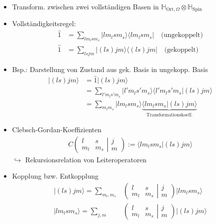 \documentclass[10pt,article,colorback,accentcolor=tud9d]{scrartcl}
\begin{document}
\begin{itemize}
	\item Transform. zwischen zwei vollständigen Basen in $\mathbb{H}_{\text{Ort},\Omega}\otimes\mathbb{H}_\text{Spin}$
  \item Vollständigkeitsregel:
    \begin{align}
    \hat{1}&=\sum_{lm_lsm_s}|lm_lsm_s\rangle\langle lm_lsm_s|\quad\text{(ungekoppelt)}\\
    \hat{1}&=\sum_{lsjm}|(ls)jm\rangle\langle (ls)jm|\quad\text{(gekoppelt)}
    \end{align}
  \item Bsp.: Darstellung von Zustand aus gek. Basis in ungekopp. Basis
    \begin{align}
    |(ls)jm\rangle&=\hat{1}|(ls)jm\rangle\\
    &=\sum_{l'm_ls'm_s}|l'm_ls'm_s\rangle\langle l'm_ls'm_s|(ls)jm\rangle\\
    &=\sum_{m_lm_s}|lm_lsm_s\rangle\underbrace{\langle lm_lsm_s|(ls)jm\rangle}_\text{Transformationskoeff.}
    \end{align}
  \item Clebsch-Gordan-Koeffizienten
    \begin{align}
    C\left(\begin{matrix}
    l&s\\
    m_l&m_s
    \end{matrix}\right.\left|\left.
    \begin{matrix}
    j\\
    m
    \end{matrix}\right)\right.
    :=\langle lm_lsm_s|(ls)jm\rangle
    \end{align}
    $\hookrightarrow$ Rekursionsrelation von Leiteroperatoren
  \item  Kopplung bzw. Entkopplung
    \begin{align}
    |(ls)jm\rangle= \sum_{m_l,m_s}&
    \left(\begin{matrix}
    l&s\\
    m_l&m_s
    \end{matrix}\right.\left|\left.
    \begin{matrix}
    j\\
    m
    \end{matrix}\right)\right.|lm_lsm_s\rangle
    \\
        |lm_lsm_s\rangle= \sum_{j,m}&
    \left(\begin{matrix}
    l&s\\
    m_l&m_s
    \end{matrix}\right.\left|\left.
    \begin{matrix}
    j\\
    m
    \end{matrix}\right)\right.|(ls)jm\rangle\\
    \end{align}
\end{itemize}
\end{document}
